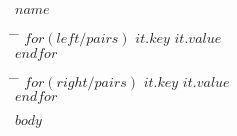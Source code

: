 \documentclass[10pt]{article}
\begin{document}
{%
\centering\huge{\textbf{\uppercase{$name$}}} \\
\hfill
}

\begin{minipage}[t]{0.5\textwidth}
	\begin{tabbing}
		\hspace{2cm} \= \hspace{4cm} \= \kill
		$for(left/pairs)$
			\textbf{$it.key$} \> {$it.value$} \\
		$endfor$
	\end{tabbing}
\end{minipage}%
\hfill
\begin{minipage}[t]{0.5\textwidth}
	\begin{tabbing}
		\hspace{2cm} \= \hspace{4cm} \= \kill
		$for(right/pairs)$
			\textbf{$it.key$} \> {$it.value$} \\
		$endfor$
	\end{tabbing}
\end{minipage}

$body$
\end{document}
